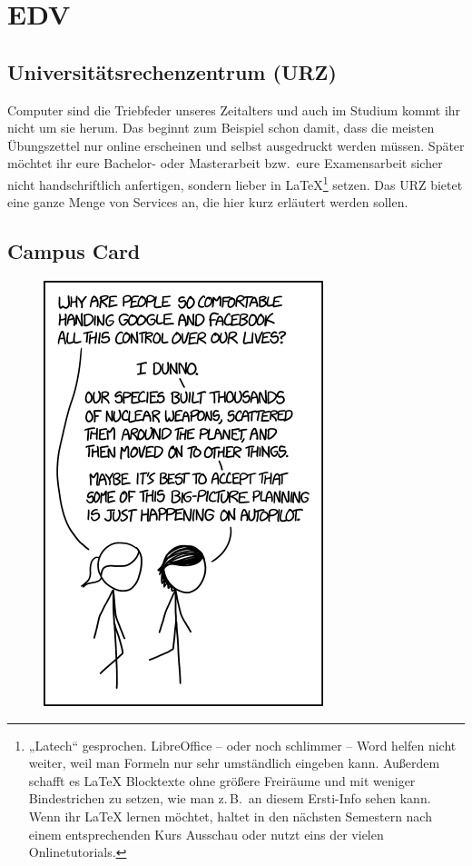 \section{EDV}

\subsection{Universitätsrechenzentrum (URZ)}
\label{urz}
Computer sind die Triebfeder unseres Zeitalters und auch im Studium kommt ihr nicht um sie herum. Das beginnt zum Beispiel schon damit, dass die meisten Übungszettel nur online erscheinen und selbst ausgedruckt werden müssen. Später möchtet ihr eure Bachelor- oder Masterarbeit bzw.\ eure Examensarbeit sicher nicht handschriftlich anfertigen, sondern lieber in \LaTeX \footnote{„Latech“ gesprochen. LibreOffice -- oder noch schlimmer -- Word helfen nicht weiter, weil man Formeln nur sehr umständlich eingeben kann. Außerdem schafft es \LaTeX{} Blocktexte ohne größere Freiräume und mit weniger Bindestrichen zu setzen, wie man z.\,B.\ an diesem Ersti-Info sehen kann. Wenn ihr \LaTeX{} lernen möchtet, haltet in den nächsten Semestern nach einem entsprechenden Kurs Ausschau oder nutzt eins der vielen Onlinetutorials.} setzen. Das \gls{URZ} bietet eine ganze Menge von Services an, die hier kurz erläutert werden sollen.

\subsection{Campus Card}
\label{campuscard}

\begin{figure}[b]
    \centering
    \includegraphics[width=.75\linewidth]{bilder/planning.png}
\end{figure}


